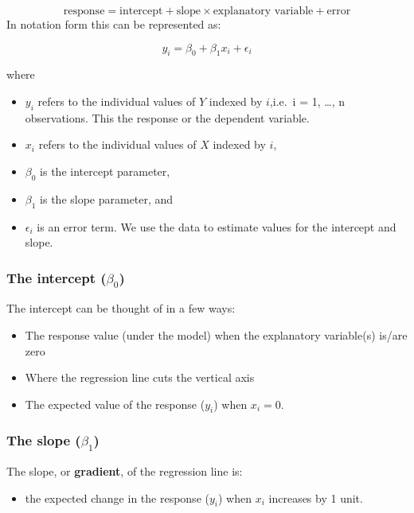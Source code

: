 \documentclass[
  oneside]{krantz}
\providecommand{\tightlist}{%
  \setlength{\itemsep}{0pt}\setlength{\parskip}{0pt}}
\begin{document}
\[\textrm{response} = \textrm{intercept} + \textrm{slope} \times \textrm{explanatory variable} + \textrm{error}\]
In notation form this can be represented as:

\[y_i = \beta_0 + \beta_1 x_i + \epsilon_i\]

where

\begin{itemize}
\tightlist
\item
  \(y_i\) refers to the individual values of \(Y\) indexed by \(i\),i.e.~i = 1, \ldots, n observations. This the response or the dependent variable.
\item
  \(x_i\) refers to the individual values of \(X\) indexed by \(i\),\\
\item
  \(\beta_0\) is the intercept parameter,
\item
  \(\beta_1\) is the slope parameter, and
\item
  \(\epsilon_i\) is an error term.
  We use the data to estimate values for the intercept and slope.
\end{itemize}

\hypertarget{the-intercept-beta_0}{%
\subsubsection{\texorpdfstring{The intercept (\(\beta_0\))}{The intercept (\textbackslash beta\_0)}}\label{the-intercept-beta_0}}

The intercept can be thought of in a few ways:

\begin{itemize}
\tightlist
\item
  The response value (under the model) when the explanatory variable(s) is/are zero
\item
  Where the regression line cuts the vertical axis
\item
  The expected value of the response (\(y_i\)) when \(x_i=0\).
\end{itemize}

\hypertarget{the-slope-beta_1}{%
\subsubsection{\texorpdfstring{The slope (\(\beta_1\))}{The slope (\textbackslash beta\_1)}}\label{the-slope-beta_1}}

The slope, or \textbf{gradient}, of the regression line is:

\begin{itemize}
\tightlist
\item
  the expected change in the response (\(y_i\)) when \(x_i\) increases by 1 unit.
\end{itemize}
\end{document}
